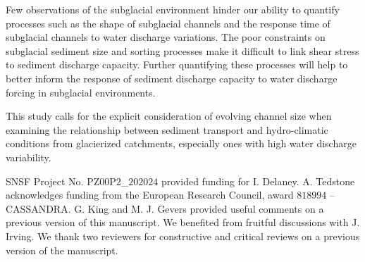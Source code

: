 \documentclass[tc, manuscript]{copernicus}
\begin{document}
Few observations of the subglacial environment hinder our ability to quantify processes such as
the shape of subglacial channels and the response time of subglacial channels to water discharge variations.
The poor constraints on subglacial sediment size and sorting processes make it difficult to link shear stress to sediment discharge capacity.
Further quantifying these processes will help to better inform the response of sediment discharge capacity to water discharge forcing in subglacial environments.

This study calls for the explicit consideration of evolving channel size when examining the relationship between sediment transport and hydro-climatic conditions from glacierized catchments, especially ones with high water discharge variability.




\begin{acknowledgements}
  SNSF Project No. $\mathrm{PZ00P2}$\_$202024$ provided  funding for I. Delaney.
  A. Tedstone acknowledges funding from the European Research Council, award $818994$ -- CASSANDRA.
  G. King and M. J. Gevers provided useful comments on a previous version of this manuscript.
  We benefited from fruitful discussions with J. Irving.
  We thank two reviewers for constructive and critical reviews on a previous version of the manuscript.
\end{acknowledgements}

\end{document}
